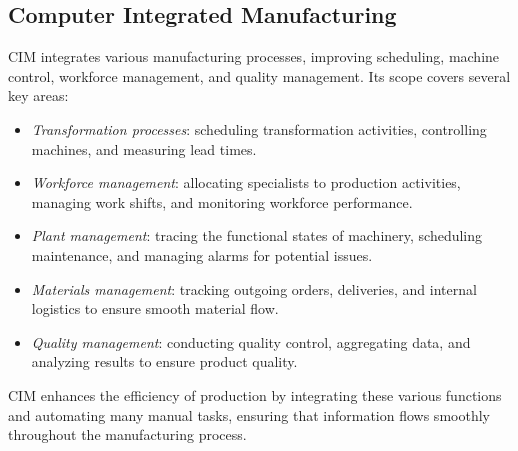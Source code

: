 \subsection{Computer Integrated Manufacturing}
CIM integrates various manufacturing processes, improving scheduling, machine control, workforce management, and quality management. Its scope covers several key areas:
\begin{itemize}
    \item \textit{Transformation processes}: scheduling transformation activities, controlling machines, and measuring lead times.
    \item \textit{Workforce management}: allocating specialists to production activities, managing work shifts, and monitoring workforce performance.
    \item \textit{Plant management}: tracing the functional states of machinery, scheduling maintenance, and managing alarms for potential issues.
    \item \textit{Materials management}: tracking outgoing orders, deliveries, and internal logistics to ensure smooth material flow.
    \item \textit{Quality management}: conducting quality control, aggregating data, and analyzing results to ensure product quality.
\end{itemize}
\noindent CIM enhances the efficiency of production by integrating these various functions and automating many manual tasks, ensuring that information flows smoothly throughout the manufacturing process.

